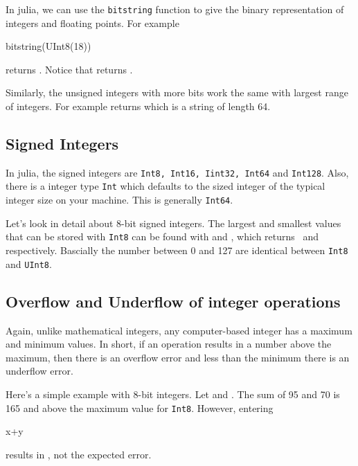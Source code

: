 In julia, we can use the \verb!bitstring! function to give the binary representation of integers and floating points.  For example 
\begin{jlblock}
bitstring(UInt8(18))
\end{jlblock}
returns  \printpythontex[verb].   Notice that  returns \printpythontex[verb]. 

Similarly, the unsigned integers with more bits work the same with largest range of integers.  For example  returns  \printpythontex[verbatim]
%
which is a string of length 64. 

\subsection{Signed Integers} 

In julia, the signed integers are \texttt{Int8, Int16, Iint32, Int64} and \texttt{Int128}. Also, there is a integer type \verb!Int! which defaults to the sized integer of the typical integer size on your machine.  This is generally \verb!Int64!.  

Let's look in detail about 8-bit signed integers.  The largest and smallest values that can be stored with \texttt{Int8} can be found with  and , which returns  \printpythontex[verb]~and  \printpythontex[verb]~ respectively.  Bascially the number between 0 and 127 are identical between \verb!Int8! and \verb!UInt8!.  

\subsection{Overflow and Underflow of integer operations}

Again, unlike mathematical integers, any computer-based integer has a maximum and minimum values.  In short, if an operation results in a number above the maximum, then there is an overflow error and less than the minimum there is an underflow error. 

Here's a simple example with 8-bit integers.  Let  and . The sum of 95 and 70 is 165 and above the maximum value for \verb!Int8!.  However, entering
\begin{jlblock}[types]
x+y
\end{jlblock}
%
results in  \printpythontex[verb], not the expected error.  

